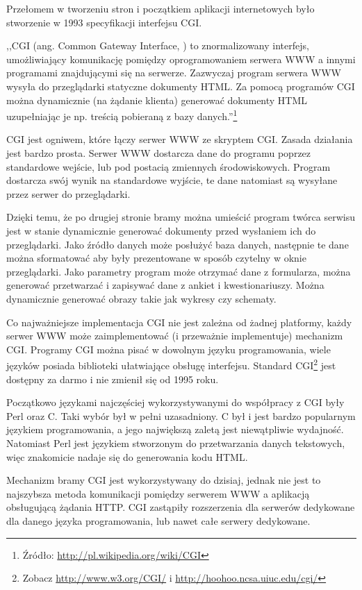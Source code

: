 \documentclass[a4paper,12pt,oneside]{report}
\begin{document}
Przełomem w tworzeniu stron i początkiem aplikacji internetowych było stworzenie w 1993 specyfikacji interfejsu CGI.

,,CGI (ang. Common Gateway Interface, ) to znormalizowany interfejs, umożliwiający komunikację pomiędzy oprogramowaniem serwera WWW a innymi programami znajdującymi się na serwerze. Zazwyczaj program serwera WWW wysyła do przeglądarki statyczne dokumenty HTML. Za pomocą programów CGI można dynamicznie (na żądanie klienta) generować dokumenty HTML uzupełniając je np. treścią pobieraną z bazy danych.''\footnote{Źródło: \url{http://pl.wikipedia.org/wiki/CGI}}

CGI jest ogniwem, które łączy serwer WWW ze skryptem CGI. Zasada działania jest bardzo prosta. Serwer WWW dostarcza dane do programu poprzez standardowe wejście, lub pod postacią zmiennych środowiskowych. Program dostarcza swój wynik na standardowe wyjście, te dane natomiast są wysyłane przez serwer do przeglądarki. 

Dzięki temu, że po drugiej stronie bramy można umieścić program twórca serwisu jest w stanie dynamicznie generować dokumenty przed wysłaniem ich do przeglądarki. Jako źródło danych  może posłużyć baza danych, następnie te dane można sformatować aby były prezentowane w sposób czytelny w oknie przeglądarki. Jako parametry program może otrzymać dane z formularza, można generować przetwarzać i zapisywać dane z ankiet i kwestionariuszy. Można dynamicznie generować obrazy takie jak wykresy czy schematy.

Co najważniejsze implementacja CGI nie jest zależna od żadnej platformy, każdy serwer WWW może zaimplementować (i przeważnie implementuje) mechanizm CGI. Programy CGI można pisać w dowolnym języku programowania, wiele języków posiada biblioteki ułatwiające obsługę interfejsu. Standard CGI\footnote{Zobacz \url{http://www.w3.org/CGI/} i \url{http://hoohoo.ncsa.uiuc.edu/cgi/}} jest dostępny za darmo i nie zmienił się od 1995 roku. 

Początkowo językami najczęściej wykorzystywanymi do współpracy z CGI były Perl oraz C. Taki wybór był w pełni uzasadniony. C był i jest bardzo popularnym językiem programowania, a jego największą zaletą jest niewątpliwie wydajność. Natomiast Perl jest językiem stworzonym do przetwarzania danych tekstowych, więc znakomicie nadaje się do generowania kodu HTML.

Mechanizm bramy CGI jest wykorzystywany do dzisiaj, jednak nie jest to najszybsza metoda komunikacji pomiędzy serwerem WWW a aplikacją obsługującą żądania HTTP. CGI zastąpiły rozszerzenia dla serwerów dedykowane dla danego języka programowania, lub nawet całe serwery dedykowane.
\end{document}
